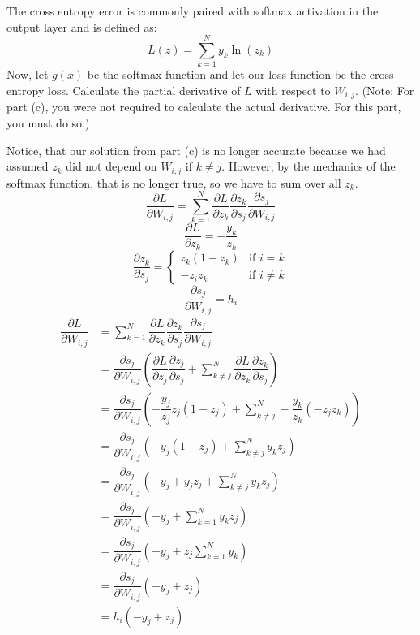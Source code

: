\begin{Parts}
The cross entropy error is commonly paired with softmax activation in the output layer and is defined as:
$$ L(z) = \sum_{k=1}^N y_k \ln (z_k)$$
Now, let $g(x)$ be the softmax function and let our loss function be the cross entropy loss. Calculate the partial derivative of $L$ with respect to $W_{i,j}$. (Note: For part (c), you were not required to calculate the actual derivative. For this part, you must do so.)

\begin{solution}
Notice, that our solution from part (c) is no longer accurate because we had assumed $z_k$ did not depend on $W_{i,j}$ if $k \neq j$. However, by the mechanics of the softmax function, that is no longer true, so we have to sum over all $z_k$.
$$ \dfrac{\partial L}{\partial W_{i,j}} = \sum_{k=1}^N \dfrac{\partial L}{\partial z_k} \dfrac{\partial z_k}{\partial s_j} \dfrac{\partial s_j}{\partial W_{i,j}}$$
$$ \dfrac{\partial L}{\partial z_k} = -\dfrac{y_k}{z_k}$$
\[
  \dfrac{\partial z_k}{\partial s_j} =
  \begin{cases}
  z_k(1-z_k)                         & \text{if $i=k$} \\
  -z_i z_k                           & \text{if $i\neq k$}
  \end{cases}
\]
$$ \dfrac{\partial s_j}{\partial W_{i,j}} = h_i $$
\begin{align*}
\dfrac{\partial L}{\partial W_{i,j}}
&= \sum_{k=1}^N \dfrac{\partial L}{\partial z_k} \dfrac{\partial z_k}{\partial s_j} \dfrac{\partial s_j}{\partial W_{i,j}}\\
&= \dfrac{\partial s_j}{\partial W_{i,j}} (\dfrac{\partial L}{\partial z_j} \dfrac{\partial z_j}{\partial s_j} + \sum_{k \neq j}^N \dfrac{\partial L}{\partial z_k} \dfrac{\partial z_k}{\partial s_j})\\
&= \dfrac{\partial s_j}{\partial W_{i,j}} (-\dfrac{y_j}{z_j} z_j(1-z_j) + \sum_{k \neq j}^N -\dfrac{y_k}{z_k} (-z_j z_k))\\
&= \dfrac{\partial s_j}{\partial W_{i,j}} (-y_j (1-z_j) + \sum_{k \neq j}^N  y_k z_j )\\
&= \dfrac{\partial s_j}{\partial W_{i,j}} (-y_j + y_j z_j + \sum_{k \neq j}^N  y_k z_j )\\
&= \dfrac{\partial s_j}{\partial W_{i,j}} (-y_j + \sum_{k = 1}^N  y_k z_j )\\
&= \dfrac{\partial s_j}{\partial W_{i,j}} (-y_j + z_j \sum_{k = 1}^N  y_k  )\\
&= \dfrac{\partial s_j}{\partial W_{i,j}} (-y_j + z_j)\\
&= h_i (-y_j + z_j)\\
\end{align*}

\end{solution}
\end{Parts}

\newpage
